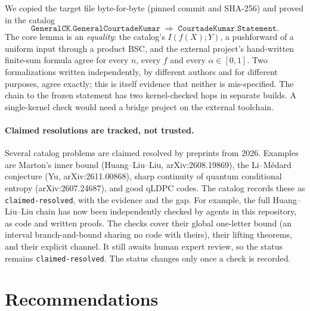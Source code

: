 \documentclass[11pt]{article}
\newcommand{\code}[1]{\texttt{#1}}
\begin{document}
We copied the target file byte-for-byte (pinned commit and SHA-256) and proved in the catalog
\[
\code{GeneralCK.GeneralCourtadeKumar}\;\Longrightarrow\;\code{CourtadeKumar.Statement}.
\]
The core lemma is an \emph{equality}: the catalog's $I(f(X);Y)$, a pushforward of a uniform
input through a product BSC, and the external project's hand-written finite-sum formula agree for
every $n$, every $f$ and every $\alpha\in[0,1]$. Two formalizations written independently,
by different authors and for different purposes, agree exactly; this is itself evidence that neither is
mis-specified. The chain to the frozen statement has two kernel-checked hops in separate builds.
A single-kernel check would need a bridge project on the external toolchain.

\paragraph{Claimed resolutions are tracked, not trusted.}
Several catalog problems are claimed resolved by preprints from 2026. Examples are Marton's inner
bound (Huang--Liu--Liu, arXiv:2608.19869), the Li--M\'edard conjecture (Yu, arXiv:2611.00868),
sharp continuity of quantum conditional entropy (arXiv:2607.24687), and good qLDPC codes. The
catalog records these as \code{claimed-resolved}, with the evidence and the gap. For example,
the full Huang--Liu--Liu chain has now been independently checked by agents in this repository,
as code and written proofs. The checks cover their global one-letter bound (an interval
branch-and-bound sharing no code with theirs), their lifting theorems, and their explicit
channel. It still awaits human expert review, so the status remains \code{claimed-resolved}. The status changes only once a check is recorded.

\FloatBarrier
\section{Recommendations}\label{sec:lessons}
\end{document}
